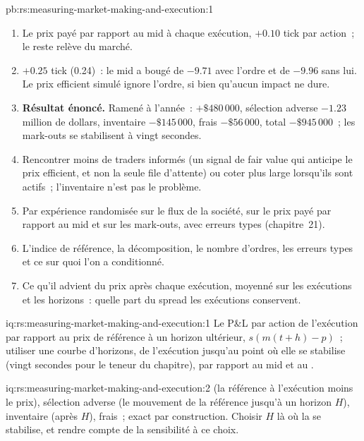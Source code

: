 \begin{solution}{pb:rs:measuring-market-making-and-execution:1}
\begin{enumerate}
frais 0.05.
\item Le prix payé par rapport au mid à chaque exécution, $+0.10$ tick par action~; le reste relève du marché.
\item $+0.25$ tick (0.24)~: le mid a bougé de $-9.71$ avec l'ordre et de $-9.96$ sans lui. Le prix efficient simulé ignore l'ordre, si bien qu'aucun impact ne dure.
\item \textbf{Résultat énoncé.} Ramené à l'année~:  $+\$480\,000$, sélection adverse $-1.23$ million de dollars, inventaire $-\$145\,000$, frais $-\$56\,000$, total
$-\$945\,000$~; les mark-outs se stabilisent à vingt secondes.
\item Rencontrer moins de traders informés (un signal de fair value qui anticipe le prix efficient, et non la seule file d'attente) ou coter plus large lorsqu'ils sont actifs~;
l'inventaire n'est pas le problème.
\item Par expérience randomisée sur le flux de la société, sur le prix payé par rapport au mid et sur les mark-outs, avec erreurs types (chapitre~21).
\item L'indice de référence, la décomposition, le nombre d'ordres, les erreurs types et ce sur quoi l'on a conditionné.
\item Ce qu'il advient du prix après chaque exécution, moyenné sur les exécutions et les horizons~: quelle part du spread les exécutions conservent.
\end{enumerate}
\end{solution}

\begin{solution}{iq:rs:measuring-market-making-and-execution:1}
Le P\&L par action de l'exécution par rapport au prix de référence à un horizon ultérieur, $s(m(t+h) - p)$~; utiliser une courbe d'horizons, de l'exécution jusqu'au point
où elle se stabilise (vingt secondes pour le teneur du chapitre), par rapport au mid et au .
\end{solution}

\begin{solution}{iq:rs:measuring-market-making-and-execution:2}
 (la référence à l'exécution moins le prix), sélection adverse (le mouvement de la référence jusqu'à un horizon $H$), inventaire (après $H$), frais~; exact
par construction. Choisir $H$ là où la  se stabilise, et rendre compte de la sensibilité à ce choix.
\end{solution}


